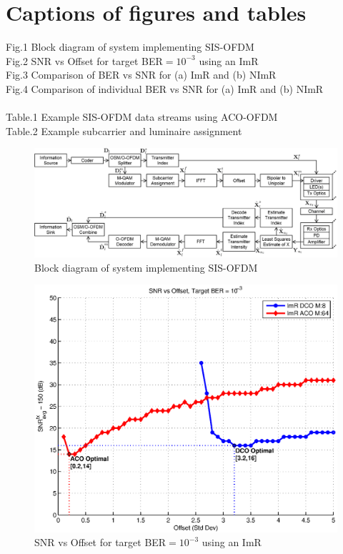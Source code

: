 \documentclass[12pt,letterpaper,onecolumn]{article} %
\begin{document}
\section*{Captions of figures and tables}
Fig.1 Block diagram of system implementing SIS-OFDM\\
Fig.2 SNR vs Offset for target BER$= 10^{-3}$ using an ImR\\
Fig.3 Comparison of BER vs SNR for (a) ImR and (b) NImR\\
Fig.4 Comparison of individual BER vs SNR for (a) ImR and (b) NImR\\
\\
Table.1 Example SIS-OFDM data streams using ACO-OFDM\\
Table.2 Example subcarrier and luminaire assignment\\

\setcounter{figure}{0}

\newpage
\begin{figure}[htp]
	\centering
		\includegraphics[trim={0.0in 0.0in 0.0in 0.0in}, clip=false, width=6.6in]{figBlockDiagram.eps}
	\caption{Block diagram of system implementing SIS-OFDM}
\end{figure}

\newpage
\begin{figure}[htp]
	\centering
		\includegraphics[trim={0.45in 0.25in 0.7in 0.0in}, clip=false, width=5in]{figSNRvsOfst.eps}
	\caption{SNR vs Offset for target BER$= 10^{-3}$ using an ImR}
\end{figure}
\end{document}
